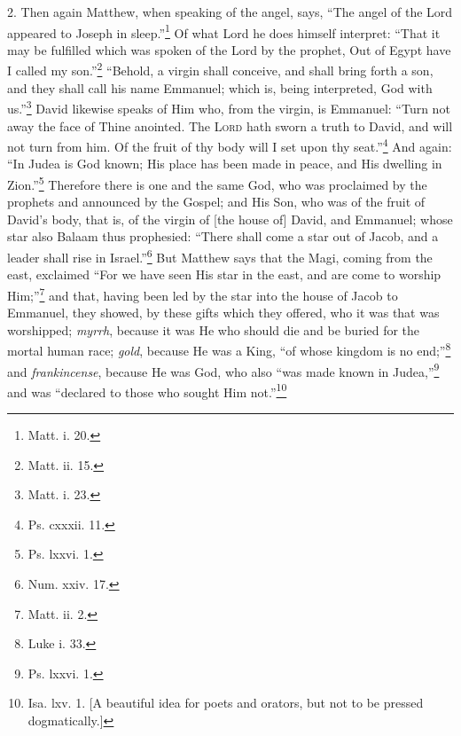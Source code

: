 2. Then again Matthew, when speaking of the angel, says, “The angel of the Lord appeared to Joseph in sleep.”\footnote{Matt. i. 20.} Of what Lord he does himself interpret: “That it may be fulfilled which was spoken of the Lord by the prophet, Out of Egypt have I called my son.”\footnote{Matt. ii. 15.} “Behold, a virgin shall conceive, and shall bring forth a son, and they shall call his name Emmanuel; which is, being interpreted, God with us.”\footnote{Matt. i. 23.} David likewise speaks of Him who, from the virgin, is Emmanuel: “Turn not away the face of Thine anointed. The \textsc{Lord} hath sworn a truth to David, and will not turn from him. Of the fruit of thy body will I set upon thy seat.”\footnote{Ps. cxxxii. 11.} And again: “In Judea is God known; His place has been made in peace, and His dwelling in Zion.”\footnote{Ps. lxxvi. 1.} Therefore there is one and the same God, who was proclaimed by the prophets and announced by the Gospel; and His Son, who was of the fruit of David’s body, that is, of the virgin of [the house of] David, and Emmanuel; whose star also Balaam thus prophesied: “There shall come a star out of Jacob, and a  leader shall rise in Israel.”\footnote{Num. xxiv. 17.} But Matthew says that the Magi, coming from the east, exclaimed “For we have seen His star in the east, and are come to worship Him;”\footnote{Matt. ii. 2.} and that, having been led by the star into the house of Jacob to Emmanuel, they showed, by these gifts which they offered, who it was that was worshipped; \emph{myrrh}, because it was He who should die and be buried for the mortal human race; \emph{gold}, because He was a King, “of whose kingdom is no end;”\footnote{Luke i. 33.} and \emph{frankincense}, because He was God, who also “was made known in Judea,”\footnote{Ps. lxxvi. 1.} and was “declared to those who sought Him not.”\footnote{Isa. lxv. 1. [A beautiful idea for poets and orators, but not to be pressed dogmatically.]}

